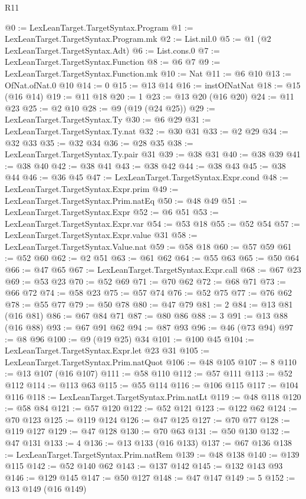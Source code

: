 \begin{lexlean}{R11}
\begin{coremodule}
@0 := LexLeanTarget.TargetSyntax.Program
@1 := LexLeanTarget.TargetSyntax.Program.mk
@2 := List.nil.{0}
@5 := @1 (@2 LexLeanTarget.TargetSyntax.Adt)
@6 := List.cons.{0}
@7 := LexLeanTarget.TargetSyntax.Function
@8 := @6 @7
@9 := LexLeanTarget.TargetSyntax.Function.mk
@10 := Nat
@11 := @6 @10
@13 := OfNat.ofNat.{0} @10
@14 := 0
@15 := @13 @14
@16 := instOfNatNat
@18 := @15 (@16 @14)
@19 := @11 @18
@20 := 1
@23 := @13 @20 (@16 @20)
@24 := @11 @23
@25 := @2 @10
@28 := @9 (@19 (@24 @25))
@29 := LexLeanTarget.TargetSyntax.Ty
@30 := @6 @29
@31 := LexLeanTarget.TargetSyntax.Ty.nat
@32 := @30 @31
@33 := @2 @29
@34 := @32 @33
@35 := @32 @34
@36 := @28 @35
@38 := LexLeanTarget.TargetSyntax.Ty.pair @31
@39 := @38 @31
@40 := @38 @39
@41 := @38 @40
@42 := @38 @41
@43 := @38 @42
@44 := @38 @43
@45 := @38 @44
@46 := @36 @45
@47 := LexLeanTarget.TargetSyntax.Expr.cond
@48 := LexLeanTarget.TargetSyntax.Expr.prim
@49 := LexLeanTarget.TargetSyntax.Prim.natEq
@50 := @48 @49
@51 := LexLeanTarget.TargetSyntax.Expr
@52 := @6 @51
@53 := LexLeanTarget.TargetSyntax.Expr.var
@54 := @53 @18
@55 := @52 @54
@57 := LexLeanTarget.TargetSyntax.Expr.value @31
@58 := LexLeanTarget.TargetSyntax.Value.nat
@59 := @58 @18
@60 := @57 @59
@61 := @52 @60
@62 := @2 @51
@63 := @61 @62
@64 := @55 @63
@65 := @50 @64
@66 := @47 @65
@67 := LexLeanTarget.TargetSyntax.Expr.call
@68 := @67 @23
@69 := @53 @23
@70 := @52 @69
@71 := @70 @62
@72 := @68 @71
@73 := @66 @72
@74 := @58 @23
@75 := @57 @74
@76 := @52 @75
@77 := @76 @62
@78 := @55 @77
@79 := @50 @78
@80 := @47 @79
@81 := 2
@84 := @13 @81 (@16 @81)
@86 := @67 @84 @71
@87 := @80 @86
@88 := 3
@91 := @13 @88 (@16 @88)
@93 := @67 @91 @62
@94 := @87 @93
@96 := @46 (@73 @94)
@97 := @8 @96
@100 := @9 (@19 @25) @34
@101 := @100 @45
@104 := LexLeanTarget.TargetSyntax.Expr.let @23 @31
@105 := LexLeanTarget.TargetSyntax.Prim.natQuot
@106 := @48 @105
@107 := 8
@110 := @13 @107 (@16 @107)
@111 := @58 @110
@112 := @57 @111
@113 := @52 @112
@114 := @113 @63
@115 := @55 @114
@116 := @106 @115
@117 := @104 @116
@118 := LexLeanTarget.TargetSyntax.Prim.natLt
@119 := @48 @118
@120 := @58 @84
@121 := @57 @120
@122 := @52 @121
@123 := @122 @62
@124 := @70 @123
@125 := @119 @124
@126 := @47 @125
@127 := @70 @77
@128 := @119 @127
@129 := @47 @128
@130 := @70 @63
@131 := @50 @130
@132 := @47 @131
@133 := 4
@136 := @13 @133 (@16 @133)
@137 := @67 @136
@138 := LexLeanTarget.TargetSyntax.Prim.natRem
@139 := @48 @138
@140 := @139 @115
@142 := @52 @140 @62
@143 := @137 @142
@145 := @132 @143 @93
@146 := @129 @145
@147 := @50 @127
@148 := @47 @147
@149 := 5
@152 := @13 @149 (@16 @149)

\end{coremodule}
\end{lexlean}
